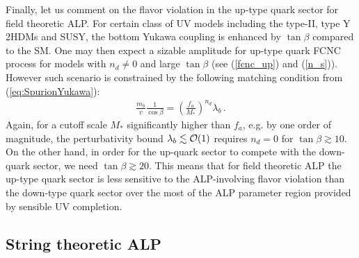\documentclass[preprint,prd,aps,tighten,nofootinbib,amssymb]{revtex4}
\newcommand{\dis}[1]{\begin{equation}\begin{split}#1\end{split}\end{equation}}
\def\vpq{f_{a}}
\begin{document}
Finally, let us comment on the flavor violation in the up-type quark sector for field theoretic ALP.
For  certain class of UV models including the type-II, type Y 2HDMs and SUSY,  the bottom Yukawa coupling is enhanced by $\tan \beta$ compared to the SM.  
One may then expect  a sizable amplitude for up-type quark FCNC process for models with $n_d\neq 0$ and large $\tan \beta$ (see (\ref{fcnc_up}) and (\ref{n_s})). 
However such scenario is constrained by the following matching condition from (\ref{eq:SpurionYukawa}):
\dis{
\frac{m_b}{v} \frac{1}{ \cos\beta} = \left(\frac{\vpq}{M_*}\right)^{n_d} \lambda_b \, .
}
Again, for a cutoff scale $M_*$ significantly higher than $\vpq$, e.g.  by one order of magnitude, the perturbativity bound  $\lambda_b \lesssim {\cal O}(1)$ requires $n_d=0$  for $\tan \beta \gtrsim 10$.
On the other hand, in order for the up-quark sector to compete with the down-quark sector, we need $\tan\beta\gtrsim 20$. 
This means that  for field theoretic ALP the up-type quark sector is less sensitive to the ALP-involving flavor violation than the down-type quark sector  over the most of the ALP parameter region provided by  sensible UV completion. 

\subsection{ String theoretic ALP}
\end{document}
